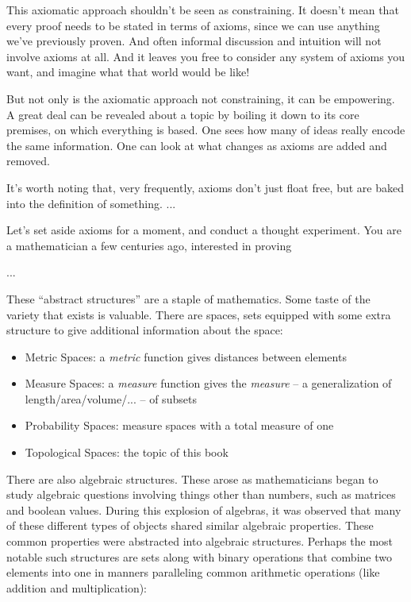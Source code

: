 \documentclass{report}
\begin{document}
This axiomatic approach shouldn't be seen as constraining. It doesn't mean that every proof needs to be stated in terms of axioms, since we can use anything we've previously proven. And often informal discussion and intuition will not involve axioms at all. And it leaves you free to consider any system of axioms you want, and imagine what that world would be like!

But not only is the axiomatic approach not constraining, it can be empowering. A great deal can be revealed about a topic by boiling it down to its core premises, on which everything is based. One sees how many of ideas really encode the same information. One can look at what changes as axioms are added and removed.

It's worth noting that, very frequently, axioms don't just float free, but are baked into the definition of something. ...

Let's set aside axioms for a moment, and conduct a thought experiment. You are a mathematician a few centuries ago, interested in proving 

...

These ``abstract structures'' are a staple of mathematics. Some taste of the variety that exists is valuable. There are spaces, sets equipped with some extra structure to give additional information about the space:

\begin{itemize}
\item Metric Spaces: a \emph{metric} function gives distances between elements
\item Measure Spaces: a \emph{measure} function gives the \emph{measure} -- a generalization of length/area/volume/... -- of subsets
\item Probability Spaces: measure spaces with a total measure of one
\item Topological Spaces: the topic of this book
\end{itemize}

There are also algebraic structures. These arose as mathematicians began to study algebraic questions involving things other than numbers, such as matrices and boolean values. During this explosion of algebras, it was observed that many of these different types of objects shared similar algebraic properties. These common properties were abstracted into algebraic structures. Perhaps the most notable such structures are sets along with binary operations that combine two elements into one in manners paralleling common arithmetic operations (like addition and multiplication):
\end{document}
